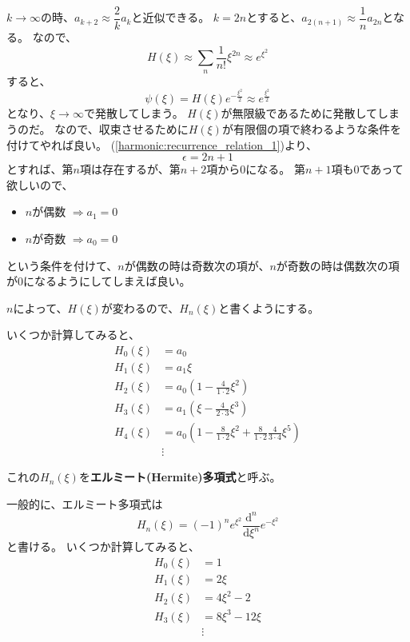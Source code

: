 $k \to \infty$の時、$a_{k+2} \approx \dfrac{2}{k}a_k$と近似できる。
$k = 2n$とすると、$a_{2(n+1)} \approx \dfrac{1}{n}a_{2n}$となる。
なので、
\begin{equation}
  H(\xi) \approx \sum_{n}\dfrac{1}{n!}\xi^{2n} \approx e^{\xi^2}
\end{equation}
すると、
\begin{equation}
  \psi(\xi) = H(\xi)e^{-\frac{\xi^2}{2}} \approx e^{\frac{\xi^2}{2}}
\end{equation}
となり、$\xi \to \infty$で発散してしまう。
$H(\xi)$が無限級であるために発散してしまうのだ。
なので、収束させるために$H(\xi)$が有限個の項で終わるような条件を付けてやれば良い。
(\ref{harmonic:recurrence_relation_1})より、
\begin{equation}
  \label{harmonic:eps_requirement}
  \epsilon = 2n + 1
\end{equation}
とすれば、第$n$項は存在するが、第$n+2$項から$0$になる。
第$n+1$項も$0$であって欲しいので、
\begin{itemize}
\item $n$が偶数 $\Rightarrow a_1 = 0$
\item $n$が奇数 $\Rightarrow a_0 = 0$
\end{itemize}
という条件を付けて、$n$が偶数の時は奇数次の項が、$n$が奇数の時は偶数次の項が$0$になるようにしてしまえば良い。

$n$によって、$H(\xi)$が変わるので、$H_n(\xi)$と書くようにする。

いくつか計算してみると、
$$
\begin{aligned} H_{0}(\xi) &=a_{0} \\ H_{1}(\xi) &=a_{1} \xi \\ H_{2}(\xi) &=a_{0}\left(1-\frac{4}{1 \cdot 2} \xi^{2}\right) \\ H_{3}(\xi) &=a_{1}\left(\xi-\frac{4}{2 \cdot 3} \xi^{3}\right) \\ H_{4}(\xi) &=a_{0}\left(1-\frac{8}{1 \cdot 2} \xi^{2}+\frac{8}{1 \cdot 2} \frac{4}{3 \cdot 4} \xi^{5}\right) \\ & \vdots
\end{aligned}
$$

これの$H_n(\xi)$を{\bf エルミート(Hermite)多項式}と呼ぶ。

一般的に、エルミート多項式は
\begin{equation}
  H_{n}(\xi)=(-1)^{n} e^{\xi^{2}} \frac{\mathrm{d}^{n}}{\mathrm{d} \xi^{n}} e^{-\xi^{2}}
\end{equation}
と書ける。
いくつか計算してみると、
\begin{equation}
  \begin{aligned}
    H_{0}(\xi) &= 1 \\
    H_{1}(\xi) &= 2 \xi \\
    H_{2}(\xi) &= 4 \xi^{2}-2 \\
    H_{3}(\xi) &= 8 \xi^{3}-12 \xi \\
    & \vdots \end{aligned}
\end{equation}

